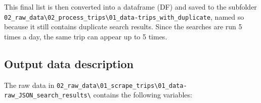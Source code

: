\documentclass[11pt,a4paper]{article}
\begin{document}
This final list is then converted into a dataframe (DF) and saved to the subfolder \\\verb|02_raw_data\02_process_trips\01_data-trips_with_duplicate|, named so because it still contains duplicate search results. 
Since the searches are run 5 times a day, the same trip can appear up to 5 times. 


\clearpage 
\subsection{Output data description}
The raw data in \verb|02_raw_data\01_scrape_trips\01_data-raw_JSON_search_results\| contains the following variables:

\end{document}
